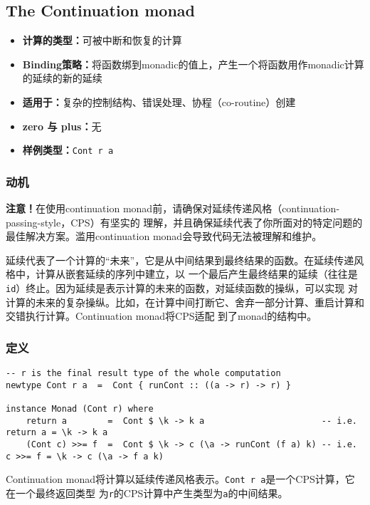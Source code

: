 \subsection{The Continuation monad}
\begin{itemize}[leftmargin=*,topsep=0pt,itemsep=0pt]
\item \textbf{计算的类型：}可被中断和恢复的计算
\item \textbf{Binding策略：}将函数绑到monadic的值上，产生一个将函数用作monadic计算的延续的新的延续
\item \textbf{适用于：}复杂的控制结构、错误处理、协程（co-routine）创建
\item \textbf{zero 与 plus：}无
\item \textbf{样例类型：}\texttt{Cont r a}
\end{itemize}

\subsubsection{动机}
\noindent{}\textbf{注意！}在使用continuation monad前，请确保对延续传递风格（continuation-passing-style，CPS）有坚实的
理解，并且确保延续代表了你所面对的特定问题的最佳解决方案。滥用continuation monad会导致代码无法被理解和维护。

\indent{}延续代表了一个计算的“未来”，它是从中间结果到最终结果的函数。在延续传递风格中，计算从嵌套延续的序列中建立，以
一个最后产生最终结果的延续（往往是\texttt{id}）终止。因为延续是表示计算的未来的函数，对延续函数的操纵，可以实现
对计算的未来的复杂操纵。比如，在计算中间打断它、舍弃一部分计算、重启计算和交错执行计算。Continuation monad将CPS适配
到了monad的结构中。

\subsubsection{定义}
\begin{verbatim}
-- r is the final result type of the whole computation
newtype Cont r a  =  Cont { runCont :: ((a -> r) -> r) }

instance Monad (Cont r) where
    return a        =  Cont $ \k -> k a                       -- i.e. return a = \k -> k a
    (Cont c) >>= f  =  Cont $ \k -> c (\a -> runCont (f a) k) -- i.e. c >>= f = \k -> c (\a -> f a k)
\end{verbatim}
\noindent{}Continuation monad将计算以延续传递风格表示。\texttt{Cont r a}是一个CPS计算，它在一个最终返回类型
为\texttt{r}的CPS计算中产生类型为\texttt{a}的中间结果。


